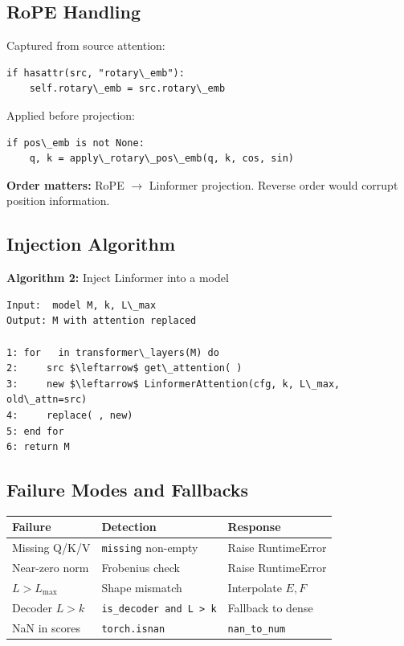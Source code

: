 \subsection{RoPE Handling}

Captured from source attention:

\begin{lstlisting}
if hasattr(src, "rotary\_emb"):
    self.rotary\_emb = src.rotary\_emb
\end{lstlisting}

Applied before projection:

\begin{lstlisting}
if pos\_emb is not None:
    q, k = apply\_rotary\_pos\_emb(q, k, cos, sin)
\end{lstlisting}

\textbf{Order matters:} RoPE $\to$ Linformer projection. Reverse order would corrupt 
position information.

\subsection{Injection Algorithm}

\textbf{Algorithm 2:} Inject Linformer into a model
\begin{lstlisting}
Input:  model M, k, L\_max
Output: M with attention replaced

1: for   in transformer\_layers(M) do
2:     src $\leftarrow$ get\_attention( )
3:     new $\leftarrow$ LinformerAttention(cfg, k, L\_max, old\_attn=src)
4:     replace( , new)
5: end for
6: return M
\end{lstlisting}

\subsection{Failure Modes and Fallbacks}

\begin{table}[H]
\centering
\small
\begin{tabular}{lll}
\toprule
\textbf{Failure} & \textbf{Detection} & \textbf{Response} \\
\midrule
Missing Q/K/V & \texttt{missing} non-empty & Raise RuntimeError \\
Near-zero norm & Frobenius check & Raise RuntimeError \\
$L > L_\text{max}$ & Shape mismatch & Interpolate $E, F$ \\
Decoder $L > k$ & \texttt{is\_decoder and L \textgreater{} k} & Fallback to dense \\
NaN in scores & \texttt{torch.isnan} & \texttt{nan\_to\_num} \\
\bottomrule
\end{tabular}
\end{table}

